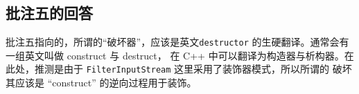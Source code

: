
\subsection{批注五的回答}
\label{sec:fix:bl5}

批注五指向的，所谓的“破坏器”，应该是英文\verb|destructor| 的生硬翻译。通常会有一组英文叫做 construct 与 destruct，
在 C++ 中可以翻译为构造器与析构器。在此处，推测是由于 \lstinline|FilterInputStream| 这里采用了装饰器模式，所以所谓的
破坏其应该是 “construct” 的逆向过程用于装饰。